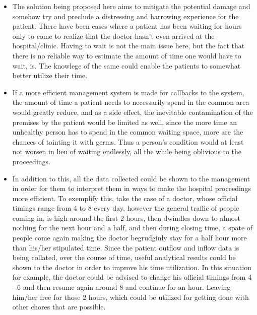 \documentclass{article}
\begin{document}
\begin{itemize}
\item 
The solution being proposed here aims to mitigate the potential damage and somehow try and preclude a distressing and harrowing experience for the patient.  There have been cases where a patient has been waiting for hours only to come to realize that the doctor hasn't even arrived at the hospital/clinic. Having to wait is not the main issue here, but the fact that there is no reliable way to estimate the amount of time one would have to wait, is. The knowlege of the same could enable the patients to somewhat better utilize their time.

\item If a more efficient management system is made for callbacks to the system, the amount of time a patient needs to necessarily spend in the common area would greatly reduce, and as a side effect, the inevitable contamination of the premises by the patient would be limited as well, since the more time an unhealthy person has to spend in the common waiting space, more are the chances of tainting it with germs. Thus a person's condition would at least not worsen in lieu of waiting endlessly, all the while being oblivious to the proceedings. 

\item 
In addition to this, all the data collected could be shown to the management in order for them to interpret them in ways to make the hospital proceedings more efficient. To exemplify this, take the case of a doctor, whose official timings range from 4 to 8 every day, however the general traffic of people coming in, is high around the first 2 hours, then dwindles down to almost nothing for the next hour and a half, and then during closing time, a spate of people come again making the doctor begrudginly stay for a half hour more than his/her stipulated time. Since the patient outflow and inflow data is being collated, over the course of time, useful analytical results could be shown to the doctor in order to improve his time utilization. In this situation for example, the doctor could be advised to change his official timings from 4 - 6 and then resume again around 8 and continue for an hour. Leaving him/her free for those 2 hours, which could be utilized for getting done with other chores that are possible. 	
\end{itemize}


\FloatBarrier	
\end{document}

